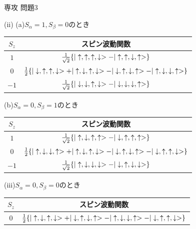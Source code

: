 \documentclass[fleqn]{jbook}
\begin{document}
\begin{answer}{専攻 問題3}{}
\begin{subanswers}
(ii) (a)$S_\alpha=1,S_\beta=0$のとき

\begin{tabular}{|c|c|}\hline
$S_z$ & スピン波動関数 \\ \hline \hline
$1$ & $\frac{1}{\sqrt{2}}\{ |\uparrow,\uparrow,\uparrow,\downarrow>-|\uparrow,\uparrow,\downarrow,\uparrow>\}$ \\ \hline
$0$ & $\frac{1}{2}\{|\downarrow,\uparrow,\uparrow,\downarrow>+|\uparrow,\downarrow,\uparrow,\downarrow>-|\downarrow,\uparrow,\downarrow,\uparrow> -|\uparrow,\downarrow,\downarrow,\uparrow>\}$ \\ \hline
$-1$ & $\frac{1}{\sqrt{2}}\{ |\downarrow,\downarrow,\uparrow,\downarrow>-|\downarrow,\downarrow,\downarrow,\uparrow>\}$ \\ \hline
\end{tabular}

(b)$S_\alpha=0,S_\beta=1$のとき

\begin{tabular}{|c|c|}\hline
$S_z$ & スピン波動関数 \\ \hline \hline
$1$ & $\frac{1}{\sqrt{2}}\{ |\uparrow,\downarrow,\uparrow,\uparrow>-|\downarrow,\uparrow,\uparrow,\uparrow>\}$ \\ \hline
$0$ & $\frac{1}{2}\{|\uparrow,\downarrow,\downarrow,\uparrow>+|\uparrow,\downarrow,\uparrow,\downarrow>-|\downarrow,\uparrow,\downarrow,\uparrow> -|\downarrow,\uparrow,\uparrow,\downarrow>\}$ \\ \hline
$-1$ & $\frac{1}{\sqrt{2}}\{ |\uparrow,\downarrow,\downarrow,\downarrow>-|\downarrow,\uparrow,\downarrow,\downarrow>\}$ \\ \hline
\end{tabular}

(iii)$S_\alpha=0,S_\beta=0$のとき

\begin{tabular}{|c|c|}\hline
$S_z$ & スピン波動関数 \\ \hline \hline
$0$ & $\frac{1}{2}\{
|\uparrow,\downarrow,\uparrow,\downarrow>+|\downarrow,\uparrow,\downarrow,\uparrow>-|\uparrow,\downarrow,\downarrow,\uparrow>-|\downarrow,\uparrow,\uparrow,\downarrow> \}$ \\ \hline
\end{tabular}

\end{subanswers}
\end{answer}
\end{document}
